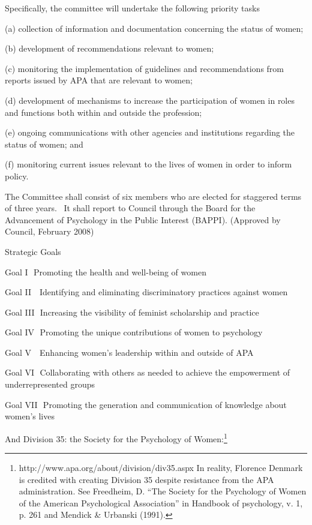 \begin{refsection}
Specifically, the committee will undertake the following priority tasks

(a) collection of information and documentation concerning the status of women;

(b) development of recommendations relevant to women;

(c) monitoring the implementation of guidelines and recommendations from reports issued by APA that are relevant to women;

(d) development of mechanisms to increase the participation of women in roles and functions both within and outside the profession;

(e) ongoing communications with other agencies and institutions regarding the status of women; and

(f) monitoring current issues relevant to the lives of women in order to inform policy.

The Committee shall consist of six members who are elected for staggered terms of three years.  It shall report to Council through the Board for the Advancement of Psychology in the Public Interest (BAPPI). (Approved by Council, February 2008)

Strategic Goals

Goal I
 Promoting the health and well-being of women

Goal II  
Identifying and eliminating discriminatory practices against women

Goal III 
Increasing the visibility of feminist scholarship and practice

Goal IV 
Promoting the unique contributions of women to psychology

Goal V  
Enhancing women's leadership within and outside of APA

Goal VI 
Collaborating with others as needed to achieve the empowerment of underrepresented groups

Goal VII 
Promoting the generation and communication of knowledge about women's lives

And Division 35: the Society for the Psychology of Women:\footnote{http:\slash \slash www.apa.org\slash about\slash division\slash div35.aspx In reality, Florence Denmark is credited with creating Division 35 despite resistance from the APA administration. See Freedheim, D. ``The Society for the Psychology of Women of the American Psychological Association'' in Handbook of psychology, v. 1, p. 261 and Mendick \& Urbanski (1991).}

\begin{quote}


\end{quote}
\end{refsection}
